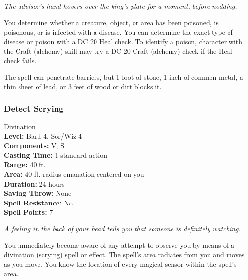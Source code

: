 \emph{The advisor's hand hovers over the king's plate for a moment, before nodding.}

You determine whether a creature, object, or area has been poisoned, is poisonous, or is infected with a disease.
You can determine the exact type of disease or poison with a DC 20 Heal check.
To identify a poison, character with the Craft (alchemy) skill may try a DC 20 Craft (alchemy) check if the Heal check fails.

The spell can penetrate barriers, but 1 foot of stone, 1 inch of common metal, a thin sheet of lead, or 3 feet of wood or dirt blocks it.
\subsubsection{Detect Scrying}
\label{Spell:DetectScrying}
Divination
\\ \textbf{Level:} Bard 4, Sor/Wiz 4
\\ \textbf{Components:} V, S
\\ \textbf{Casting Time:} 1 standard action
\\ \textbf{Range:} 40 ft.
\\ \textbf{Area:} 40-ft.-radius emanation centered on you
\\ \textbf{Duration:} 24 hours
\\ \textbf{Saving Throw:} None
\\ \textbf{Spell Resistance:} No
\\ \textbf{Spell Points:} 7

\emph{A feeling in the back of your head tells you that someone is definitely watching.}

You immediately become aware of any attempt to observe you by means of a divination (scrying) spell or effect. 
The spell's area radiates from you and moves as you move. 
You know the location of every magical sensor within the spell's area.

